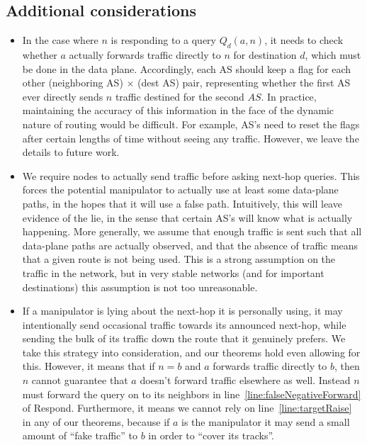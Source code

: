 \documentclass[10pt]{article}
\begin{document}
  \subsection{Additional considerations}
  \begin{itemize}
    \item In the case where $n$ is responding to a query $Q_d(a,n)$, it needs to
      check whether $a$ actually forwards traffic directly to $n$ for
      destination $d$, which must be done in the data plane. Accordingly, each
      AS should keep a flag for each other (neighboring AS) $\times$ (dest AS)
      pair, representing whether the first AS ever directly sends $n$ traffic
      destined for the second $AS$.
      In practice, maintaining the accuracy of this information in the
      face of the dynamic nature of routing would be difficult.
      For example, AS's need to reset the flags after certain lengths of time
      without seeing any traffic.
      However, we leave the details to future work.

    \item We require nodes to actually send traffic before asking next-hop
      queries. This forces the potential manipulator to actually use at least
      some data-plane paths, in the hopes that it will use a false path.
      Intuitively, this will leave evidence of the lie, in the sense that
      certain AS's will know what is actually happening.
      More generally, we assume that enough traffic is sent such that
      all data-plane paths are actually observed, and
      that the absence of traffic means that a given route is not
      being used. This is a strong assumption on the traffic in the network, but
      in very stable networks (and for important destinations) this assumption
      is not too unreasonable.

    \item If a manipulator is lying about the next-hop it is personally using,
      it may intentionally send occasional traffic towards its announced
      next-hop, while sending the bulk of its traffic down the route that it
      genuinely prefers. We take this strategy into consideration, and our
      theorems hold even allowing for this.
      However, it means that if $n=b$ and $a$ forwards traffic directly to $b$,
      then $n$ cannot guarantee that $a$ doesn't forward traffic elsewhere as well.
      Instead $n$ must forward the query on to its neighbors
      in line~\ref{line:falseNegativeForward} of {\sc Respond}.
      Furthermore, it means we cannot rely on line~\ref{line:targetRaise}
      in any of our theorems, because if $a$ is the manipulator
      it may send a small amount of ``fake traffic'' to $b$
      in order to ``cover its tracks''.
  \end{itemize}
\end{document}
